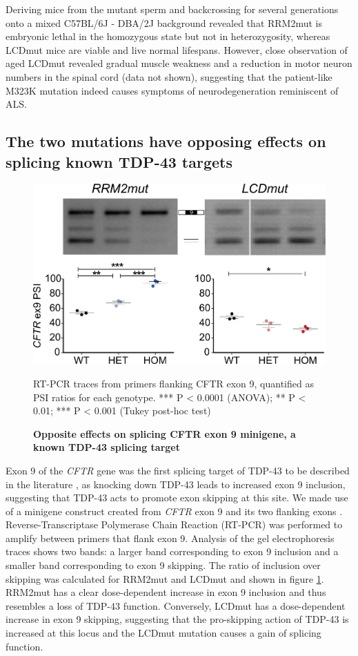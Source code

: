 Deriving mice from the mutant sperm and backcrossing for several generations onto a mixed C57BL/6J - DBA/2J background revealed that RRM2mut is embryonic lethal in the homozygous state but not in heterozygosity, whereas LCDmut mice are viable and live normal lifespans. However, close observation of aged LCDmut revealed gradual muscle weakness and a reduction in motor neuron numbers in the spinal cord (data not shown), suggesting that the patient-like M323K mutation indeed causes symptoms of neurodegeneration reminiscent of ALS. 

\subsection{The two mutations have opposing effects on splicing known TDP-43 targets}


\begin{figure}[h!]
	\centering
	\includegraphics[width=12cm]{Figures/05_tdp_mice/CFTR.png}
	\caption{\textbf{Opposite effects on splicing CFTR exon 9 minigene, a known TDP-43 splicing target}}
	RT-PCR traces from primers flanking CFTR exon 9, quantified as PSI ratios for each genotype. *** P < 0.0001 (ANOVA); ** P < 0.01; *** P < 0.001 (Tukey post-hoc test)	
	\label{fig:CFTR}
\end{figure}

Exon 9 of the \textit{CFTR} gene was the first splicing target of TDP-43 to be described in the literature \citep{Buratti2001-et}, as knocking down TDP-43 leads to increased exon 9 inclusion, suggesting that TDP-43 acts to promote exon skipping at this site. We made use of a minigene construct created from \textit{CFTR} exon 9 and its two flanking exons  \citep{Buratti2007minigene}.   Reverse-Transcriptase Polymerase Chain Reaction (RT-PCR) was performed to amplify between primers that flank exon 9. Analysis of the gel electrophoresis traces shows two bands: a larger band corresponding to exon 9 inclusion and a smaller band corresponding to exon 9 skipping. The ratio of inclusion over skipping was calculated for RRM2mut and LCDmut and shown in figure \ref{fig:CFTR}. RRM2mut has a clear dose-dependent increase in exon 9 inclusion and thus resembles a loss of TDP-43 function. Conversely, LCDmut has a dose-dependent increase in exon 9 skipping, suggesting that the pro-skipping action of TDP-43 is increased at this locus and the LCDmut mutation causes a gain of splicing function.


